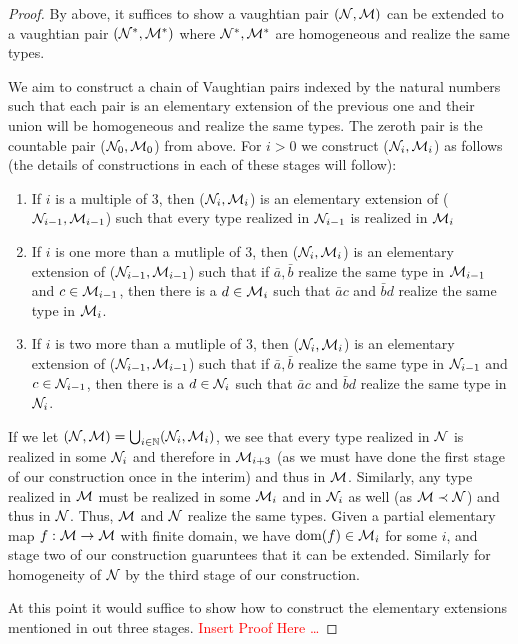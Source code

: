 \begin{proof}
By above, it suffices to show a vaughtian pair \((\mathcal{N}, \mathcal{M})\) can be extended to a vaughtian pair \((\mathcal{N}^*, \mathcal{M}^*)\) where \(\mathcal{N}^*, \mathcal{M}^*\) are homogeneous and realize the same types. 

We aim to construct a chain of Vaughtian pairs indexed by the natural numbers such that each pair is an elementary extension of the previous one and their union will be homogeneous and realize the same types. 
The zeroth pair is the countable pair (\(\mathcal{N}_0, \mathcal{M}_0\)) from above. 
For \(i > 0\) we construct (\(\mathcal{N}_i, \mathcal{M}_i\)) as follows (the details of constructions in each of these stages will follow):
\begin{enumerate}
\item  If \(i\) is a multiple of 3, then (\(\mathcal{N}_i, \mathcal{M}_i\)) is an elementary extension of (\(\mathcal{N}_{i-1}, \mathcal{M}_{i-1}\)) such that every type realized in \(\mathcal{N}_{i-1}\) is realized in \(\mathcal{M}_i\)
\item  If \(i\) is one more than a mutliple of 3, then (\(\mathcal{N}_i, \mathcal{M}_i\)) is an elementary extension of (\(\mathcal{N}_{i-1}, \mathcal{M}_{i-1}\)) such that if \(\bar{a}, \bar{b}\) realize the same type in \(\mathcal{M}_{i-1}\) and \(c \in \mathcal{M}_{i-1}\), then there is a \(d \in \mathcal{M}_i\) such that \(\bar{a}c\) and \(\bar{b}d\) realize the same type in \(\mathcal{M}_i\). 
\item If \(i\) is two more than a mutliple of 3, then (\(\mathcal{N}_i, \mathcal{M}_i\)) is an elementary extension of (\(\mathcal{N}_{i-1}, \mathcal{M}_{i-1}\)) such that if \(\bar{a}, \bar{b}\) realize the same type in \(\mathcal{N}_{i-1}\) and \(c \in \mathcal{N}_{i-1}\), then there is a \(d \in \mathcal{N}_i\) such that \(\bar{a}c\) and \(\bar{b}d\) realize the same type in \(\mathcal{N}_i\).
\end{enumerate}
If we let \((\mathcal{N}, \mathcal{M}) = \bigcup_{i \in \mathbb{N}}(\mathcal{N}_i, \mathcal{M}_i)\), we see that every type realized in \(\mathcal{N}\) is realized in some \(\mathcal{N}_i\) and therefore in \(\mathcal{M}_{i+3}\) (as we must have done the first stage of our construction once in the interim) and thus in \(\mathcal{M}\). 
Similarly, any type realized in \(\mathcal{M}\) must be realized in some \(\mathcal{M}_i\) and in \(\mathcal{N}_i\) as well (as \(\mathcal{M} \prec \mathcal{N}\)) and thus in \(\mathcal{N}\).
Thus, \(\mathcal{M}\) and  \(\mathcal{N}\) realize the same types.  
Given a partial elementary map \(f:\mathcal{M} \to \mathcal{M}\) with finite domain, we have \(\text{dom}(f) \in \mathcal{M}_i\) for some \(i\), and stage two of our construction guaruntees that it can be extended. 
Similarly for homogeneity of \(\mathcal{N}\) by the third stage of our construction. 

At this point it would suffice to show how to construct the elementary extensions mentioned in out three stages. 
\textcolor{red}{Insert Proof Here \ldots}

\end{proof}

